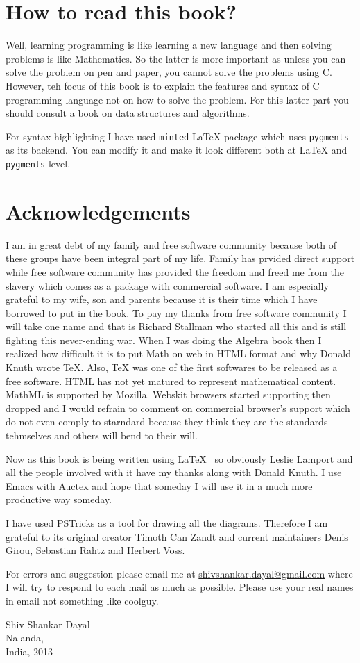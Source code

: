 \section{How to read this book?}
Well, learning programming is like learning a new language and then solving
problems is like Mathematics. So the latter is more important as unless you can
solve the problem on pen and paper, you cannot solve the problems using
C. However, teh focus of this book is to explain the features and syntax of C
programming language not on how to solve the problem. For this latter part you
should consult a book on data structures and algorithms.

For syntax highlighting I have used \texttt{minted} \LaTeX{} package which uses
\texttt{pygments} as its backend. You can modify it and make it look different
both at \LaTeX{} and \texttt{pygments} level.

\section{Acknowledgements}
I am in great debt of my family and free software community because both of
these groups have been integral part of my life. Family has prvided direct
support while free software community has provided the freedom and freed me
from the slavery which comes as a package with commercial software. I am
especially grateful to my wife, son and parents because it is their time which
I have borrowed to put in the book. To pay my thanks from free software
community  I will take one name and that is Richard Stallman who started all
this  and is still fighting this never-ending war. When I was doing the Algebra
book then I realized how difficult it is to put Math on web in HTML format and
why Donald Knuth wrote \TeX{}. Also, \TeX{} was one of the first softwares to
be released as a free software. HTML has not yet matured to represent
mathematical content. MathML is supported by Mozilla. Webskit browsers started
supporting 
then dropped and I would refrain to comment on commercial browser's support
which do not even comply to starndard because they think they are the standards
tehmselves and others will bend to their will.

Now as this book is being written using \LaTeX{}~ so obviously Leslie Lamport
and all the people involved with it have my thanks along with Donald Knuth. I
use Emacs with Auctex and hope that someday I will use it in a much more
productive way someday.

I have used PSTricks as a tool for drawing all the diagrams. Therefore I am
grateful to its original creator Timoth Can Zandt and current maintainers Denis
Girou, Sebastian Rahtz and Herbert Voss.

For errors and suggestion please email me at
\href{mailto:shivshankar.dayal@gmail.com}{shivshankar.dayal@gmail.com} where I
will try to respond to each mail as
much as possible. Please use your real names in email not something like
coolguy.
\begin{flushright}
Shiv Shankar Dayal\\
Nalanda,\\
India, 2013
\end{flushright}
